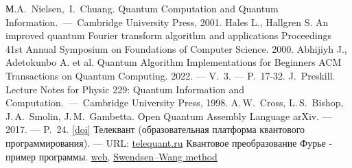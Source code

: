 \documentclass[12pt,a4paper]{article}
\begin{document}
		
	\newpage
	\begin{thebibliography}{99}
		\hypertarget{references}{}
		М.A.~Nielsen,~I.~Chuang. Quantum Computation and Quantum Information.~---~Cambridge University Press, 2001.  
		Hales L., Hallgren S. An improved quantum Fourier transform algorithm
		and applications  Proceedings 41st Annual Symposium on Foundations of
		Computer Science. 2000.
		Abhijiyh J., Adetokunbo A. et al. Quantum Algorithm Implementations for
		Beginners  ACM Transactions on Quantum Computing. 2022. --- V.~3. --- P.~17-32.
		J.~Preskill.
		Lecture Notes for Physic 229: Quantum Information and Computation.~---~Cambridge University Press, 1998.
		A.\,W.~Cross, L.\,S.~Bishop, J.\,A.~Smolin, J.\,M.~Gambetta.
		{
			Open Quantum Assembly Language} arXiv. --- 2017. --- P.~24.
		\href{https://doi.org/10.48550/arXiv.1707.03429
		}{[doi]}
		Телеквант (образовательная платформа квантового программирования). --- URL: \href{https://telequant.ru/}{telequant.ru}
		{Квантовое преобразование Фурье - пример программы.}
		\href{https://translated.turbopages.org/proxy_u/en-ru.ru.e8177666-682d0f64-17c7c950-74722d776562/https/stackoverflow.com/questions/63342432/python-quantum-fourier-transform}{web},
		\href{https://inference.org.uk/itila/swendsen.pdf}{Swendsen–Wang method}
		
	\end{thebibliography}
\end{document}
